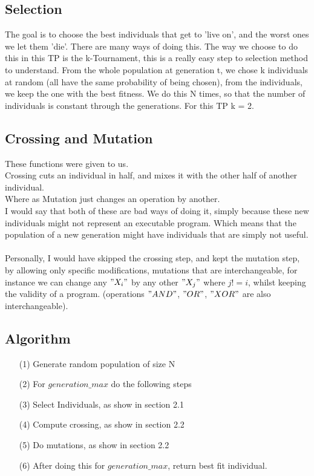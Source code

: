 \documentclass[a4paper]{article}
\begin{document}
\subsection{Selection}
The goal is to choose the best individuals that get to 'live on', and the worst ones we let them 'die'. There are many ways of doing this. The way we choose to do this in this TP is the k-Tournament, this is a really easy step to selection method to understand. From the whole population at generation t, we chose k individuals at random (all have the same probability of being chosen), from the individuals, we keep the one with the best fitness. We do this N times, so that the number of individuals is constant through the generations. For this TP k = 2.
\subsection{Crossing and Mutation}
These functions were given to us.\\
Crossing cuts an individual in half, and mixes it with the other half of another individual.\\
Where as Mutation just changes an operation by another.\\
I would say that both of these are bad ways of doing it, simply because these new individuals might not represent an executable program. Which means that the population of a new generation might have individuals that are simply not useful.\\\\
Personally, I would have skipped the crossing step, and kept the mutation step, by allowing only specific modifications, mutations that are interchangeable, for instance we can change any $"X_i"$ by any other $"X_j"$ where $j != i$, whilst keeping the validity of a program. (operations $"AND"$, $"OR"$, $"XOR"$ are also interchangeable).


\subsection{Algorithm}
\begin{itemize}
\item[(1)] Generate random population of size N
\item[(2)] For $generation\_max$ do the following steps
\item[(3)] Select Individuals, as show in section 2.1
\item[(4)] Compute crossing, as show in section 2.2 
\item[(5)] Do mutations, as show in section 2.2
\item[(6)] After doing this for $generation\_max$, return best fit individual.
\end{itemize}
\newpage
\end{document}
